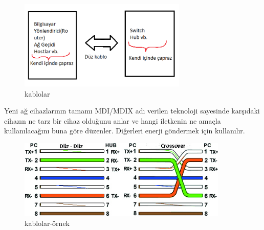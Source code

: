 \begin{figure}[ht]
    \centering
    \includegraphics[width=8cm]{images/caprazduzz}
    \caption{kablolar}
    \label{fig:caprazduz_kablo}
\end{figure}

Yeni ağ cihazlarının tamamı MDI/MDIX adı verilen teknoloji sayesinde karşıdaki cihazın ne tarz bir cihaz olduğunu anlar ve hangi iletkenin ne amaçla kullanılacağını buna göre  düzenler. Diğerleri enerji göndermek için kullanılır.

\begin{figure}[ht]
    \centering
    \includegraphics[width=10cm]{images/ethcable}
    \caption{kablolar-örnek}
    \label{fig:caprazduz_kablo_ornek_gosterim}
\end{figure}

